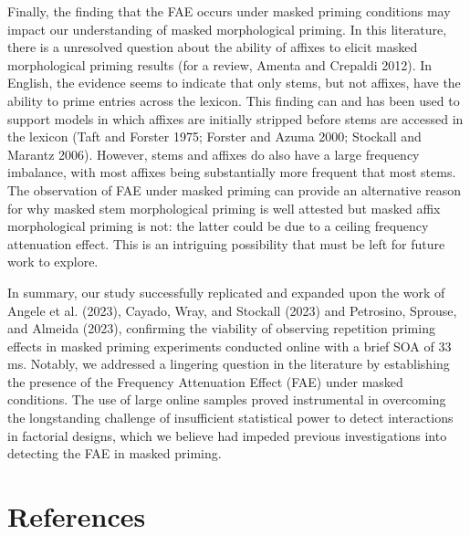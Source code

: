 \documentclass[
]{interact}
\begin{document}
Finally, the finding that the FAE occurs under masked priming conditions
may impact our understanding of masked morphological priming. In this
literature, there is a unresolved question about the ability of affixes
to elicit masked morphological priming results (for a review, Amenta and
Crepaldi 2012). In English, the evidence seems to indicate that only
stems, but not affixes, have the ability to prime entries across the
lexicon. This finding can and has been used to support models in which
affixes are initially stripped before stems are accessed in the lexicon
(Taft and Forster 1975; Forster and Azuma 2000; Stockall and Marantz
2006). However, stems and affixes do also have a large frequency
imbalance, with most affixes being substantially more frequent that most
stems. The observation of FAE under masked priming can provide an
alternative reason for why masked stem morphological priming is well
attested but masked affix morphological priming is not: the latter could
be due to a ceiling frequency attenuation effect. This is an intriguing
possibility that must be left for future work to explore.

In summary, our study successfully replicated and expanded upon the work
of Angele et al. (2023), Cayado, Wray, and Stockall (2023) and
Petrosino, Sprouse, and Almeida (2023), confirming the viability of
observing repetition priming effects in masked priming experiments
conducted online with a brief SOA of 33 ms. Notably, we addressed a
lingering question in the literature by establishing the presence of the
Frequency Attenuation Effect (FAE) under masked conditions. The use of
large online samples proved instrumental in overcoming the longstanding
challenge of insufficient statistical power to detect interactions in
factorial designs, which we believe had impeded previous investigations
into detecting the FAE in masked priming.

\section*{References}\label{references}
\end{document}
